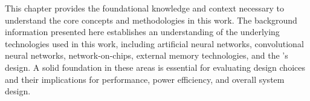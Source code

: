 This chapter provides the foundational knowledge and context necessary to understand the core concepts and methodologies in this work.
The background information presented here establishes an understanding of the underlying technologies used in this work, including artificial neural networks, convolutional neural networks, network-on-chips, external memory technologies, and the \graicore{}'s design.
A solid foundation in these areas is essential for evaluating design choices and their implications for performance, power efficiency, and overall system design.